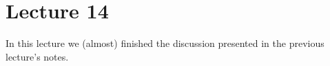 \section{Lecture 14}

In this lecture we (almost) finished the discussion presented in the previous lecture's notes.

